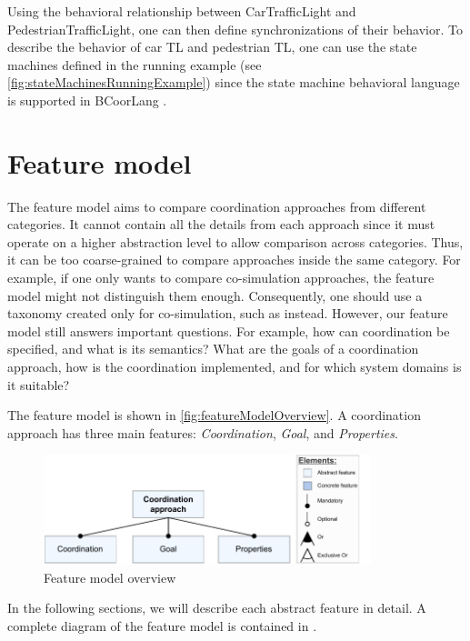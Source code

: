 \documentclass[runningheads]{llncs}
\begin{document}
Using the behavioral relationship between \textsf{CarTrafficLight} and \textsf{PedestrianTrafficLight}, one can then define synchronizations of their behavior.
To describe the behavior of car TL and pedestrian TL, one can use the state machines defined in the running example (see \autoref{fig:stateMachinesRunningExample}) since the state machine behavioral language is supported in BCoorLang \cite{krauterBehavioralConsistencyMultimodeling2023}.


\section{Feature model} \label{sec:features}
The feature model aims to compare coordination approaches from different categories.
It cannot contain all the details from each approach since it must operate on a higher abstraction level to allow comparison across categories.
Thus, it can be too coarse-grained to compare approaches inside the same category.
For example, if one only wants to compare co-simulation approaches, the feature model might not distinguish them enough.
Consequently, one should use a taxonomy created only for co-simulation, such as \cite{gomesCoSimulationSurvey2019} instead.
However, our feature model still answers important questions.
For example, how can coordination be specified, and what is its semantics?
What are the goals of a coordination approach, how is the coordination implemented, and for which system domains is it suitable?

The feature model is shown in \autoref{fig:featureModelOverview}.
A coordination approach has three main features: \textit{Coordination}, \textit{Goal}, and \textit{Properties}.

\begin{figure}[ht]
	\centering
	\includegraphics[width=0.85\textwidth]{images/root}
	\caption{Feature model overview}
	\label{fig:featureModelOverview}
\end{figure}

In the following sections, we will describe each abstract feature in detail.
A complete diagram of the feature model is contained in \cite{timkrauterArtifactsCoordination2024}.
\end{document}

